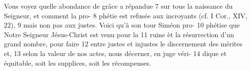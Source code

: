 Vous voyez quelle abondance de grâce a répandue	 
7	 	sur tous la naissance du Seigneur, et comment la pro-	 
8	 	phétie est refusée aux incroyants (cf. I Cor., XIV, 22),	 
9	 	mais non pas aux justes. Voici qu'à son tour Siméon pro-	 
10	 	phétise que Notre Seigneur Jésus-Christ est venu pour la	 
11	 	ruine èt la résurrection d'un grand nombre, pour faire	 
12	 	entre justes et injustes le discernement des mérites et,	 
13	 	selon la valeur de nos actes, nous décerner, en juge véri-	 
14	 	dique et équitable, soit les supplices, soit les récompenses.